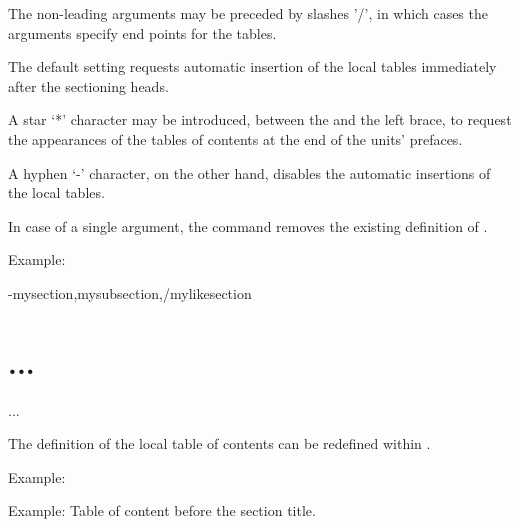 The non-leading arguments may be preceded by slashes '/', in
which cases the arguments specify end points for the tables.

The default setting requests automatic insertion of the local
tables immediately after the sectioning heads.

A star `*' character may be introduced, between the   and
the left brace, to request the appearances of the tables of
contents at the end of the units' prefaces.

A hyphen `-' character, on the other hand, disables the automatic
insertions of the local tables.

In case of a single argument, the command removes the
existing definition of .

    Example:

\begin{texsource}
\TocAt-{mysection,mysubsection,/mylikesection}
\section{...}...\Tocmysection
\end{texsource}

The definition  of the local table of contents can be redefined
within .

Example:

\begin{texsource}
\def\Tocsection{\TableOfContents[section]}

\end{texsource}

Example: Table of content before the section title.

\begin{texsource}
   {\Tocsection \let\saveTocsection=\Tocsection
    \def\Tocsection{\let\Tocsection=\saveTocsection}%
    \ifvmode \IgnorePar\fi \EndP\IgnorePar
    \TitleMark\space\HtmlParOff}
   {\HtmlParOn\ShowPar \IgnoreIndent \par}
 \end{texsource}

